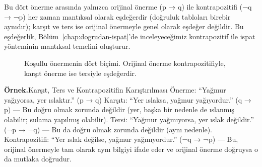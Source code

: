 Bu dört önerme arasında yalnızca orijinal önerme (p → q) ile kontrapozitifi (¬q → ¬p) her zaman mantıksal olarak eşdeğerdir (doğruluk tabloları birebir aynıdır); karşıt ve ters ise orijinal önermeyle genel olarak eşdeğer değildir. Bu eşdeğerlik, Bölüm~\ref{chap:dogrudan-ispat}’de inceleyeceğimiz kontrapozitif ile ispat yönteminin mantıksal temelini oluşturur.

\begin{figure}[htbp]
\centering
{}
\caption{Koşullu önermenin dört biçimi. Orijinal önerme kontrapozitifiyle, karşıt önerme ise tersiyle eşdeğerdir.}
\end{figure}

\begin{tcolorbox}[bookbox,colback=cEx]\textbf{\textsf{\textcolor{cAcc}{Örnek.}}}\quad Karşıt, Ters ve Kontrapozitifin Karıştırılması Önerme: “Yağmur yağıyorsa, yer ıslaktır.” (p → q) Karşıtı: “Yer ıslaksa, yağmur yağıyordur.” (q → p) — Bu doğru olmak zorunda değildir (yer, başka bir nedenle de ıslanmış olabilir; sulama yapılmış olabilir). Tersi: “Yağmur yağmıyorsa, yer ıslak değildir.” (¬p → ¬q) — Bu da doğru olmak zorunda değildir (aynı nedenle). Kontrapozitifi: “Yer ıslak değilse, yağmur yağmıyordur.” (¬q → ¬p) — Bu, orijinal önermeyle tam olarak aynı bilgiyi ifade eder ve orijinal önerme doğruysa o da mutlaka doğrudur.\end{tcolorbox}

